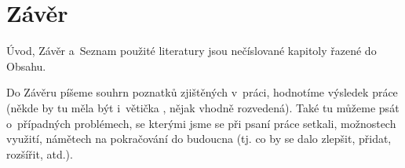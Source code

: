 \section*{Závěr}


Úvod, Závěr a~Seznam použité literatury jsou nečíslované kapitoly řazené do Obsahu.

Do Závěru píšeme souhrn poznatků zjištěných v~práci, hodnotíme výsledek práce (někde by tu měla být i~větička , nějak vhodně rozvedená). Také tu můžeme psát o~případných problémech, se kterými jsme se při psaní práce setkali, možnostech využití, námětech na pokračování do budoucna (tj. co by se dalo zlepšit, přidat, rozšířit, atd.).

